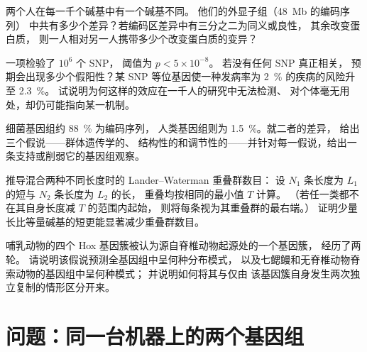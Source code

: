 \begin{exercise}[$\star\star$]\label{exo:b3:genomics:8}
两个人在每一千个碱基中有一个碱基不同。
他们的外显子组（\qty{48}{Mb} 的编码序列）
中共有多少个差异？若编码区差异中有三分之二为同义或良性，
其余改变蛋白质，
则一人相对另一人携带多少个改变蛋白质的变异？
\end{exercise}

\begin{exercise}[$\star\star$]\label{exo:b3:genomics:9}
一项检验了 $10^{6}$ 个 SNP，
阈值为 $p < 5\times 10^{-8}$。
若没有任何 SNP 真正相关，
预期会出现多少个假阳性？某 SNP 等位基因使一种发病率为 \qty{2}{\%} 的疾病的风险升至 \qty{2.3}{\%}。
试说明为何这样的效应在一千人的研究中无法检测、
对个体毫无用处，却仍可能指向某一机制。
\end{exercise}

\begin{exercise}[$\star\star\star$]\label{exo:b3:genomics:10}
细菌基因组约 \qty{88}{\%} 为编码序列，
人类基因组则为 \qty{1.5}{\%}。就二者的差异，
给出三个假说——群体遗传学的、
结构性的和调节性的——并针对每一假说，给出一条支持或削弱它的基因组观察。
\end{exercise}

\begin{exercise}[$\star\star\star$]\label{exo:b3:genomics:11}
推导混合两种不同长度时的 Lander–Waterman 重叠群数目：
设 $N_{1}$ 条长度为
$L_{1}$ 的短与 $N_{2}$ 条长度为 $L_{2}$ 的长，
重叠均按相同的最小值 $T$ 计算。
（若任一类都不在其自身长度减 $T$ 的范围内起始，
则将每条视为其重叠群的最右端。）
证明少量长比等量碱基的短更能显著减少重叠群数目。
\end{exercise}

\begin{exercise}[$\star\star\star$]\label{exo:b3:genomics:12}
哺乳动物的四个 Hox 基因簇被认为源自脊椎动物起源处的一个基因簇，
经历了两轮。
请说明该假说预测全基因组中呈何种分布模式，
以及七鳃鳗和无脊椎动物脊索动物的基因组中呈何种模式；
并说明如何将其与仅由
该基因簇自身发生两次独立复制的情形区分开来。
\end{exercise}

\section{问题：同一台机器上的两个基因组}

